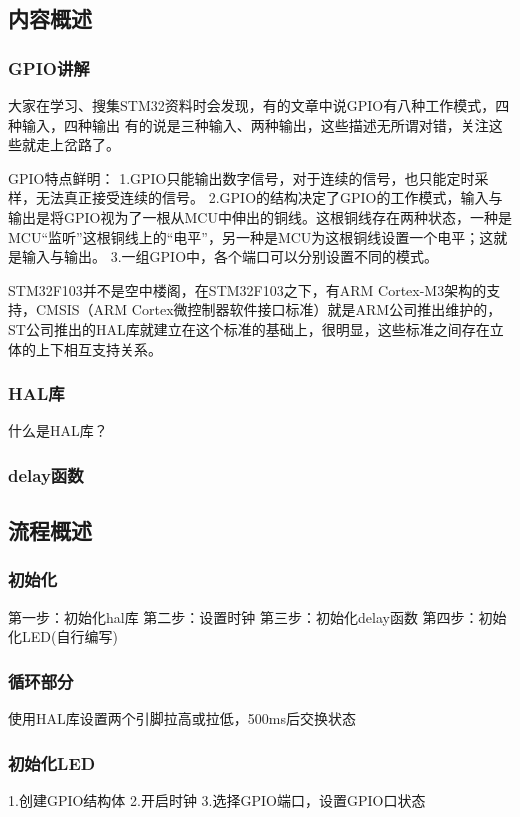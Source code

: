 \documentclass[UTF8]{ctexart}
\begin{document}
\subsection{内容概述}
\subsubsection{GPIO讲解}
大家在学习、搜集STM32资料时会发现，有的文章中说GPIO有八种工作模式，四种输入，四种输出
有的说是三种输入、两种输出，这些描述无所谓对错，关注这些就走上岔路了。

GPIO特点鲜明：
1.GPIO只能输出数字信号，对于连续的信号，也只能定时采样，无法真正接受连续的信号。
2.GPIO的结构决定了GPIO的工作模式，输入与输出是将GPIO视为了一根从MCU中伸出的铜线。这根铜线存在两种状态，一种是MCU“监听”这根铜线上的“电平”，另一种是MCU为这根铜线设置一个电平；这就是输入与输出。
3.一组GPIO中，各个端口可以分别设置不同的模式。

STM32F103并不是空中楼阁，在STM32F103之下，有ARM Cortex-M3架构的支持，CMSIS（ARM Cortex微控制器软件接口标准）就是ARM公司推出维护的，ST公司推出的HAL库就建立在这个标准的基础上，很明显，这些标准之间存在立体的上下相互支持关系。

\subsubsection{HAL库}
什么是HAL库？
\subsubsection{delay函数}
\subsection{流程概述}
\subsubsection{初始化}
第一步：初始化hal库
第二步：设置时钟
第三步：初始化delay函数
第四步：初始化LED(自行编写)
\subsubsection{循环部分}
使用HAL库设置两个引脚拉高或拉低，500ms后交换状态
\subsubsection{初始化LED}
1.创建GPIO结构体
2.开启时钟
3.选择GPIO端口，设置GPIO口状态
\end{document}

